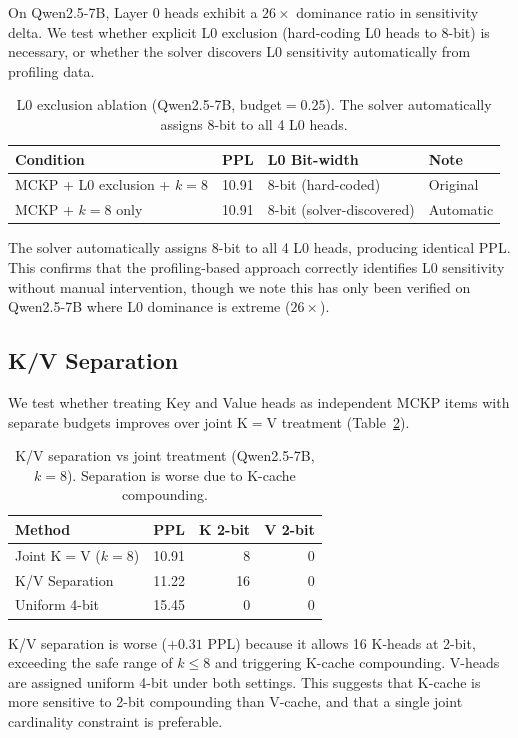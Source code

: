 \documentclass[11pt,a4paper]{article}
\begin{document}
On Qwen2.5-7B, Layer 0 heads exhibit a $26\times$ dominance ratio in sensitivity delta.
We test whether explicit L0 exclusion (hard-coding L0 heads to 8-bit) is necessary, or whether the solver discovers L0 sensitivity automatically from profiling data.

\begin{table}[h]
\centering
\caption{L0 exclusion ablation (Qwen2.5-7B, budget$=0.25$). The solver automatically assigns 8-bit to all 4 L0 heads.}
\label{tab:l0_ablation}
\begin{tabular}{@{}lrll@{}}
\toprule
Condition & PPL & L0 Bit-width & Note \\
\midrule
MCKP + L0 exclusion + $k{=}8$ & 10.91 & 8-bit (hard-coded) & Original \\
MCKP + $k{=}8$ only & 10.91 & 8-bit (solver-discovered) & Automatic \\
\bottomrule
\end{tabular}
\end{table}

The solver automatically assigns 8-bit to all 4 L0 heads, producing identical PPL.
This confirms that the profiling-based approach correctly identifies L0 sensitivity without manual intervention, though we note this has only been verified on Qwen2.5-7B where L0 dominance is extreme ($26\times$).

\subsection{K/V Separation}

We test whether treating Key and Value heads as independent MCKP items with separate budgets improves over joint K$=$V treatment (Table~\ref{tab:kv_sep}).

\begin{table}[h]
\centering
\caption{K/V separation vs joint treatment (Qwen2.5-7B, $k{=}8$). Separation is worse due to K-cache compounding.}
\label{tab:kv_sep}
\begin{tabular}{@{}lrrr@{}}
\toprule
Method & PPL & K 2-bit & V 2-bit \\
\midrule
Joint K$=$V ($k{=}8$) & 10.91 & 8 & 0 \\
K/V Separation & 11.22 & 16 & 0 \\
Uniform 4-bit & 15.45 & 0 & 0 \\
\bottomrule
\end{tabular}
\end{table}

K/V separation is worse ($+0.31$ PPL) because it allows 16 K-heads at 2-bit, exceeding the safe range of $k \le 8$ and triggering K-cache compounding.
V-heads are assigned uniform 4-bit under both settings.
This suggests that K-cache is more sensitive to 2-bit compounding than V-cache, and that a single joint cardinality constraint is preferable.
\end{document}
